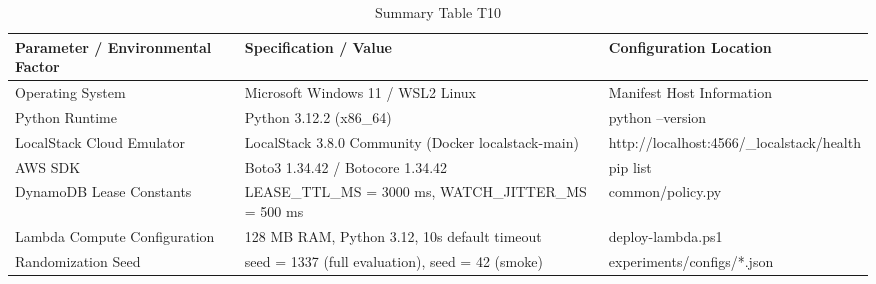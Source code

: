 \begin{table}[htbp]
\centering
\caption{Summary Table T10}
\label{tab:t10}
\begin{tabular}{lll}
\toprule
Parameter / Environmental Factor & Specification / Value & Configuration Location \\
\midrule
Operating System & Microsoft Windows 11 / WSL2 Linux & Manifest Host Information \\
Python Runtime & Python 3.12.2 (x86\_64) & python --version \\
LocalStack Cloud Emulator & LocalStack 3.8.0 Community (Docker localstack-main) & http://localhost:4566/\_localstack/health \\
AWS SDK & Boto3 1.34.42 / Botocore 1.34.42 & pip list \\
DynamoDB Lease Constants & LEASE\_TTL\_MS = 3000 ms, WATCH\_JITTER\_MS = 500 ms & common/policy.py \\
Lambda Compute Configuration & 128 MB RAM, Python 3.12, 10s default timeout & deploy-lambda.ps1 \\
Randomization Seed & seed = 1337 (full evaluation), seed = 42 (smoke) & experiments/configs/*.json \\
\bottomrule
\end{tabular}
\end{table}
